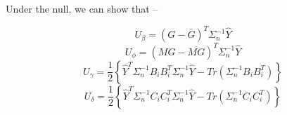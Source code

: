 \documentclass[hidelinks]{article}
\begin{document}
Under the null, we can show that  --

\begin{equation*}
U_\beta = \left(G-\bar{G}\right)^T \Sigma_n^{-1} \hat{Y}
\end{equation*}
\begin{equation*}
U_\phi =  \left(MG-\overline{MG}\right)^T \Sigma_n^{-1} \hat{Y}
\end{equation*}
\begin{equation*}
U_\gamma = \frac{1}{2} \left\{ \hat{Y}^T \Sigma_n^{-1} B_iB_i^T \Sigma_n^{-1} \hat{Y} - Tr \left(\Sigma_n^{-1} B_i B_i^T\right)\right\}
\end{equation*}
\begin{equation*}
U_\delta = \frac{1}{2} \left\{\hat{Y}^T \Sigma_n^{-1} C_iC_i^T \Sigma_n^{-1}\hat{Y}- Tr \left(\Sigma_n^{-1} C_i C_i^T\right)\right\}
\end{equation*}

%
%


\end{document}
